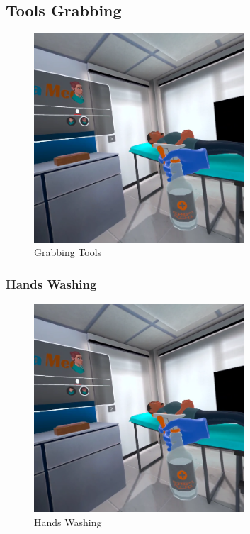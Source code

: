 \subsection{Tools Grabbing}
\begin{figure}[h]
	\centering
	\includegraphics[width=0.7\textwidth, height=0.3\textheight]{Images/Grabbing Tool.png}
	\caption{Grabbing Tools}
	\label{fig:Grabbing Tools}
\end{figure}
\newpage
\subsubsection{Hands Washing}
\begin{figure}[h]
	\centering
     \includegraphics[width=0.7\textwidth, height=0.3\textheight]{Images/Washing hands.png}
	\caption{Hands Washing}
	\label{fig:Hands Washing}
\end{figure}

